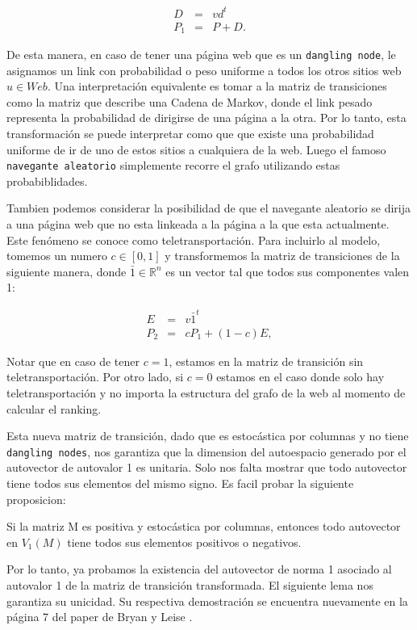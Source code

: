 \begin{eqnarray*}
D & = & v d^t \\
P_1 & = & P + D.
\end{eqnarray*}

De esta manera, en caso de tener una página web que es un \texttt{dangling node}, le asignamos un link con probabilidad o peso uniforme a todos los otros sitios web $u \in Web$. Una interpretación equivalente es tomar a la matriz de transiciones como la matriz que describe una Cadena de Markov, donde el link pesado representa la probabilidad de dirigirse de una página a la otra. Por lo tanto, esta transformación se puede interpretar como que que existe una probabilidad uniforme de ir de uno de estos sitios a cualquiera de la web. Luego el famoso \texttt{navegante aleatorio} simplemente recorre el grafo utilizando estas probabiblidades.

Tambien podemos considerar la posibilidad de que el navegante aleatorio se dirija a una página web que no esta linkeada a la página a la que esta actualmente. Este fenómeno se conoce como teletransportación. Para incluirlo al modelo, tomemos un numero $c \in [0,1]$ y transformemos la matriz de transiciones de la siguiente manera, donde $\bar{1} \in \mathbb{R}^n$ es un vector tal que todos sus componentes valen 1:

\begin{eqnarray*}
E & = & v \bar{1}^t \\
P_2 & = & cP_1 + (1-c)E,
\end{eqnarray*}

Notar que en caso de tener $c=1$, estamos en la matriz de transición sin teletransportación. Por otro lado, si $c=0$ estamos en el caso donde solo hay teletransportación y no importa la estructura del grafo de la web al momento de calcular el ranking.

Esta nueva matriz de transición, dado que es estocástica por columnas y no tiene \texttt{dangling nodes}, nos garantiza que la dimension del autoespacio generado por el autovector de autovalor 1 es unitaria. Solo nos falta mostrar que todo autovector tiene todos sus elementos del mismo signo. Es facil probar la siguiente proposicion:

\begin{proposition}
Si la matriz M es positiva y estocástica por columnas, entonces todo autovector en $V_1(M)$ tiene todos sus elementos positivos o negativos.
\end{proposition}

Por lo tanto, ya probamos la existencia del autovector de norma 1 asociado al autovalor 1 de la matriz de transición transformada. El siguiente lema nos garantiza su unicidad. Su respectiva demostración se encuentra nuevamente en la página 7 del paper de Bryan y Leise \cite{Bryan2006}.

